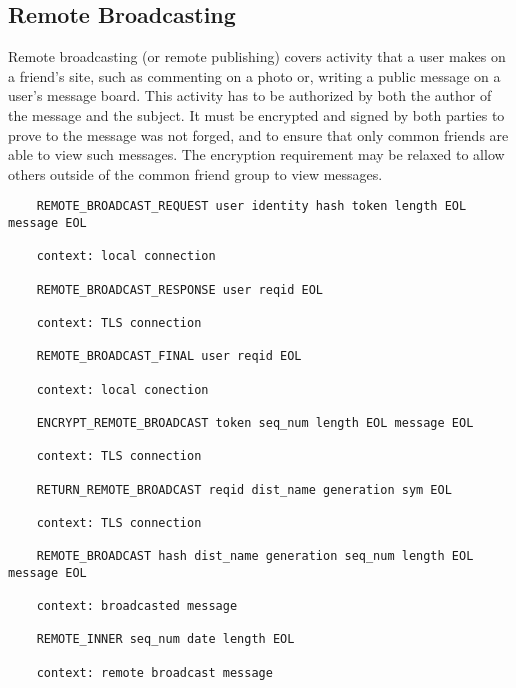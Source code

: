 \documentclass[letterpaper,11pt,oneside]{article}
\begin{document}
\subsection{Remote Broadcasting}

Remote broadcasting (or remote publishing) covers activity that a user makes on
a friend's site, such as commenting on a photo or, writing a public message on
a user's message board. This activity has to be authorized by both the author
of the message and the subject. It must be encrypted and signed by both parties
to prove to the message was not forged, and to ensure that only common friends
are able to view such messages. The encryption requirement may be relaxed to
allow others outside of the common friend group to view messages.

\vspace{10pt}
\begin{verbatim}
    REMOTE_BROADCAST_REQUEST user identity hash token length EOL message EOL

    context: local connection

    REMOTE_BROADCAST_RESPONSE user reqid EOL 

    context: TLS connection

    REMOTE_BROADCAST_FINAL user reqid EOL 

    context: local conection

    ENCRYPT_REMOTE_BROADCAST token seq_num length EOL message EOL

    context: TLS connection

    RETURN_REMOTE_BROADCAST reqid dist_name generation sym EOL

    context: TLS connection

    REMOTE_BROADCAST hash dist_name generation seq_num length EOL message EOL

    context: broadcasted message
    
    REMOTE_INNER seq_num date length EOL

    context: remote broadcast message
\end{verbatim}
\end{document}
